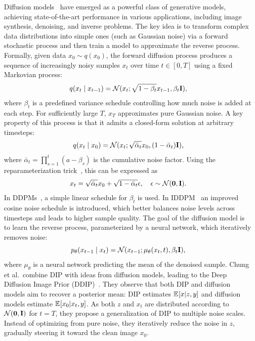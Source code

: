 Diffusion models~\cite{Diffusion} have emerged as a powerful class of generative models, achieving state-of-the-art performance in various applications, including image synthesis, denoising, and inverse problems. The key idea is to transform complex data distributions into simple ones (such as Gaussian noise) via a forward stochastic process and then train a model to approximate the reverse process.
Formally, given data $x_0 \sim q(x_0)$, the forward diffusion process produces a sequence of increasingly noisy samples $x_t$ over time $t \in [0,T]$ using a fixed Markovian process:
\begin{equation}
    q(x_t \mid x_{t-1}) = \mathcal{N}(x_t;\sqrt{1 - \beta_t} x_{t-1},\beta_t \mathbf{I}),
\end{equation}
where $\beta_t$ is a predefined variance schedule controlling how much noise is added at each step. For sufficiently large $T$, $x_T$ approximates pure Gaussian noise.
A key property of this process is that it admits a closed-form solution at arbitrary timesteps:
\begin{equation}
    q(x_t \mid x_0) = \mathcal{N}(x_t;\sqrt{\bar{\alpha}_t} x_0,(1-\bar{\alpha}_t) \mathbf{I}),
\end{equation}
where $\bar{\alpha}_t = \prod_{s=1}^{t} (a - \beta_s)$ is the cumulative noise factor.
Using the reparameterization trick~\cite{VAE}, this can be expressed as
\begin{equation}
    x_t = \sqrt{\bar{\alpha}_t}x_0 + \sqrt{1-\bar{\alpha}_t}\epsilon, \quad \epsilon \sim \mathcal{N}(\mathbf{0},\mathbf{I}).
\end{equation}
In DDPMs~\cite{DDPM}, a simple linear schedule for $\beta_t$ is used. In IDDPM~\cite{IDDPM} an improved cosine noise schedule is introduced, which better balances noise levels across timesteps and leads to higher sample quality.
The goal of the diffusion model is to learn the reverse process, parameterized by a neural network, which iteratively removes noise:
\begin{equation}
    p_\theta(x_{t-1} \mid x_t) = \mathcal{N}(x_{t-1};\mu_\theta(x_t, t),\beta_t \mathbf{I}),
\end{equation}
where $\mu_\theta$ is a neural network predicting the mean of the denoised sample.
\newpage
Chung et al.\ combine DIP with ideas from diffusion models, leading to the Deep Diffusion Image Prior (DDIP)~\cite{DDIP}.
They observe that both DIP and diffusion models aim to recover a posterior mean:
DIP estimates $\mathbb{E}_{ } [x | z,y]$ and diffusion models estimate $\mathbb{E}_{ } [x_0 | x_t,y]$.
As both $z$ and $x_t$ are distributed according to $\mathcal{N}(\mathbf{0},\mathbf{I})$ for $t=T$, they propose a generalization of DIP to multiple noise scales. Instead of optimizing from pure noise, they iteratively reduce the noise in $z$, gradually steering it toward the clean image $x_0$.
